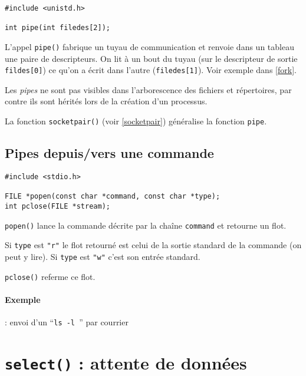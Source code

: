 \extrait
\begin{lstlisting}
#include <unistd.h>

int pipe(int filedes[2]);
\end{lstlisting}


L'appel \texttt{pipe()} fabrique un tuyau de communication et renvoie dans
un tableau une paire de descripteurs.  On lit à un bout du tuyau (sur
le descripteur de sortie \texttt{fildes[0]})
 ce qu'on a écrit dans l'autre (\texttt{filedes[1]}). 
 Voir exemple dans \ref{fork}.


Les \emph{pipes} ne sont pas visibles dans l'arborescence des fichiers et
répertoires, par contre ils sont hérités lors de la création d'un 
processus.

La fonction \texttt{socketpair()} (voir
\ref{socketpair}) généralise la fonction
\texttt{pipe}.

\subsection{Pipes depuis/vers une commande}


\extrait
\begin{lstlisting}
#include <stdio.h>
  
FILE *popen(const char *command, const char *type);
int pclose(FILE *stream);
\end{lstlisting}


\texttt{popen()} lance la commande décrite par la chaîne \texttt{command}
et retourne un flot.


Si \texttt{type} est \texttt{"r"} le flot retourné est celui 
de la sortie standard de la commande (on peut y lire). 
Si \texttt{type} est \texttt{"w"} 
c'est son entrée standard.

\texttt{pclose()} referme ce flot.



\paragraph*{Exemple} :    envoi d'un  ``\texttt{ls -l }'' par courrier 

\source





\section{\texttt{select()} : attente de données }

